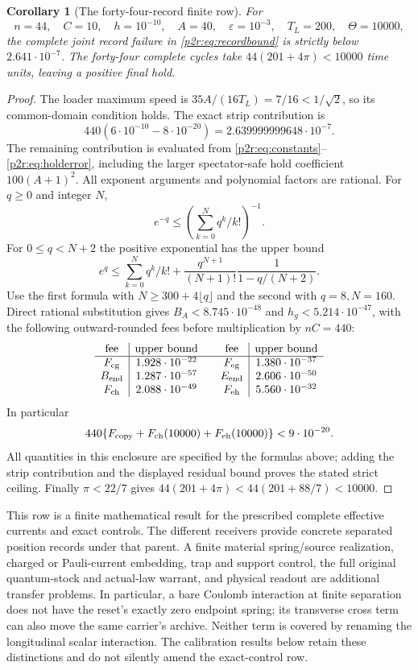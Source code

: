 \documentclass[11pt]{article}
\numberwithin{equation}{section}
\newtheorem{corollary}[theorem]{Corollary}
\theoremstyle{definition}
\theoremstyle{remark}
\begin{document}
\begin{corollary}[The forty-four-record finite row]
\label{p2r:cor:n44}
For
\begin{equation}\label{p2r:eq:row}
 n=44,\quad C=10,\quad h=10^{-10},\quad A=40,\quad
 \varepsilon=10^{-3},\quad T_L=200,\quad\Theta=10000,
\end{equation}
the complete joint record failure in
\eqref{p2r:eq:recordbound} is strictly below
$2.641\cdot10^{-7}$.
The forty-four complete cycles take
$44(201+4\pi)<10000$ time units, leaving a positive final hold.
\end{corollary}
\begin{proof}
The loader maximum speed is
$35A/(16T_L)=7/16<1/\sqrt2$, so its common-domain condition
holds. The exact strip contribution is
\[
 440(6\cdot10^{-10}-8\cdot10^{-20})
             =2.639999999648\cdot10^{-7}.
\]
The remaining contribution is evaluated from
\eqref{p2r:eq:constants}--\eqref{p2r:eq:holderror}, including
the larger spectator-safe hold coefficient $100(A+1)^2$.
All exponent arguments and polynomial factors are rational.
For $q\geq0$ and integer $N$,
\[
 e^{-q}\leq
   \left(\sum_{k=0}^Nq^k/k!\right)^{-1}.
\]
For $0\leq q<N+2$ the positive exponential has the upper bound
\[
 e^q\leq\sum_{k=0}^Nq^k/k!+
       \frac{q^{N+1}}{(N+1)!}\frac1{1-q/(N+2)}.
\]
Use the first formula with $N\geq300+4\lfloor q\rfloor$
and the second with $q=8,N=160$. Direct rational substitution
gives $B_A<8.745\cdot10^{-48}$ and
$h_g<5.214\cdot10^{-47}$, with the following outward-rounded
fees before multiplication by $nC=440$:
\[
\begin{array}{c|c@{\qquad}c|c}
 \text{fee}&\text{upper bound}&\text{fee}&\text{upper bound}\\ \hline
 F_{\rm cg}&1.928\cdot10^{-22}&F_{\rm eg}&1.380\cdot10^{-37}\\
 B_{\rm end}&1.287\cdot10^{-57}&E_{\rm end}&2.606\cdot10^{-50}\\
 F_{\rm ch}&2.088\cdot10^{-49}&F_{\rm eh}&5.560\cdot10^{-32}
\end{array}
\]
In particular
\[
 440\{F_{\rm copy}+F_{\rm ch}(10000)+F_{\rm eh}(10000)\}
                  <9\cdot10^{-20}.
\]
All quantities in this enclosure are specified by the formulas above;
adding the strip contribution and the displayed residual bound proves
the stated strict ceiling. Finally
$\pi<22/7$ gives
$44(201+4\pi)<44(201+88/7)<10000$.
\end{proof}

This row is a finite mathematical result for the prescribed
complete effective currents and exact controls. The different
receivers provide concrete separated position records under
that parent. A finite material spring/source realization,
charged or Pauli-current embedding, trap and support control,
the full original quantum-stock and actual-law warrant, and
physical readout are additional transfer problems.
In particular, a bare Coulomb interaction at finite separation
does not have the reset's exactly zero endpoint spring; its
transverse cross term can also move the same carrier's archive.
Neither term is covered by renaming the longitudinal scalar
interaction. The calibration results below retain these
distinctions and do not silently amend the exact-control row.
\end{document}
